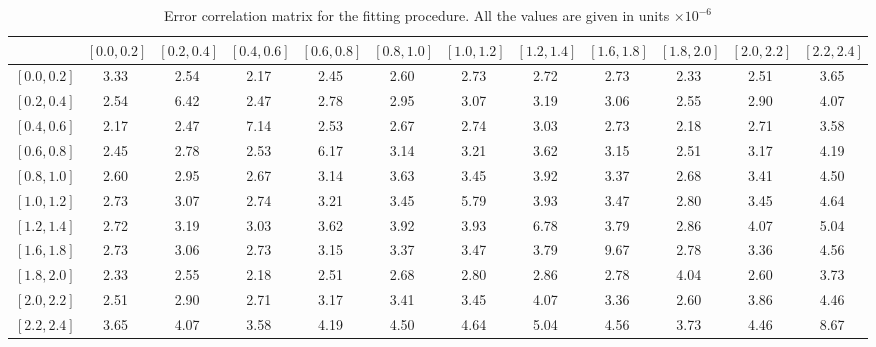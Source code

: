 \begin{table}[htbp]
   \begin{center}
      \begin{tabular}{l|ccccccccccc}

& \scriptsize{$\left[0.0,0.2\right]$}
& \scriptsize{$\left[0.2,0.4\right]$}
& \scriptsize{$\left[0.4,0.6\right]$}
& \scriptsize{$\left[0.6,0.8\right]$}
& \scriptsize{$\left[0.8,1.0\right]$}
& \scriptsize{$\left[1.0,1.2\right]$}
& \scriptsize{$\left[1.2,1.4\right]$}
& \scriptsize{$\left[1.6,1.8\right]$}
& \scriptsize{$\left[1.8,2.0\right]$}
& \scriptsize{$\left[2.0,2.2\right]$}
& \scriptsize{$\left[2.2,2.4\right]$} \\ \hline

\scriptsize{$\left[0.0,0.2\right]$}& 3.33& 2.54& 2.17& 2.45& 2.60& 2.73& 2.72& 2.73& 2.33& 2.51& 3.65 \\
\scriptsize{$\left[0.2,0.4\right]$}& 2.54& 6.42& 2.47& 2.78& 2.95& 3.07& 3.19& 3.06& 2.55& 2.90& 4.07 \\
\scriptsize{$\left[0.4,0.6\right]$}& 2.17& 2.47& 7.14& 2.53& 2.67& 2.74& 3.03& 2.73& 2.18& 2.71& 3.58 \\
\scriptsize{$\left[0.6,0.8\right]$}& 2.45& 2.78& 2.53& 6.17& 3.14& 3.21& 3.62& 3.15& 2.51& 3.17& 4.19 \\
\scriptsize{$\left[0.8,1.0\right]$}& 2.60& 2.95& 2.67& 3.14& 3.63& 3.45& 3.92& 3.37& 2.68& 3.41& 4.50 \\
\scriptsize{$\left[1.0,1.2\right]$}& 2.73& 3.07& 2.74& 3.21& 3.45& 5.79& 3.93& 3.47& 2.80& 3.45& 4.64 \\
\scriptsize{$\left[1.2,1.4\right]$}& 2.72& 3.19& 3.03& 3.62& 3.92& 3.93& 6.78& 3.79& 2.86& 4.07& 5.04 \\
\scriptsize{$\left[1.6,1.8\right]$}& 2.73& 3.06& 2.73& 3.15& 3.37& 3.47& 3.79& 9.67& 2.78& 3.36& 4.56 \\
\scriptsize{$\left[1.8,2.0\right]$}& 2.33& 2.55& 2.18& 2.51& 2.68& 2.80& 2.86& 2.78& 4.04& 2.60& 3.73 \\
\scriptsize{$\left[2.0,2.2\right]$}& 2.51& 2.90& 2.71& 3.17& 3.41& 3.45& 4.07& 3.36& 2.60& 3.86& 4.46 \\
\scriptsize{$\left[2.2,2.4\right]$}& 3.65& 4.07& 3.58& 4.19& 4.50& 4.64& 5.04& 4.56& 3.73& 4.46& 8.67 \\

      \end{tabular}
    \end{center}
  \caption{\label{tab_corr_fit}Error correlation matrix for the fitting procedure. All the values are given in units $\times 10^{-6}$ }
\end{table}

